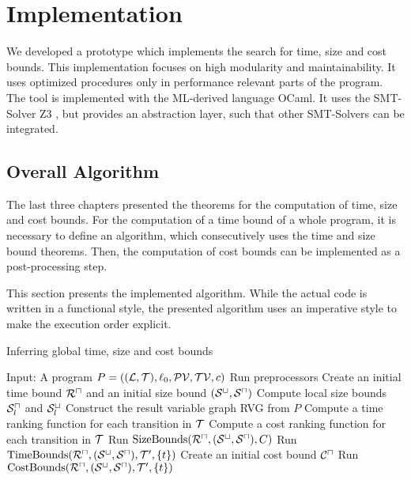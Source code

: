 \section{Implementation}

We developed a prototype which implements the search for time, size and cost bounds.
This implementation focuses on high modularity and maintainability.
It uses optimized procedures only in performance relevant parts of the program.
The tool is implemented with the ML-derived language OCaml.
It uses the SMT-Solver Z3 \cite{z3}, but provides an abstraction layer, such that other SMT-Solvers can be integrated.

\subsection{Overall Algorithm}

The last three chapters presented the theorems for the computation of time, size and cost bounds.
For the computation of a time bound of a whole program, it is necessary to define an algorithm, which consecutively uses the time and size bound theorems.
Then, the computation of cost bounds can be implemented as a post-processing step.

This section presents the implemented algorithm.
While the actual code is written in a functional style, the presented algorithm uses an imperative style to make the execution order explicit.

\begin{algorithm}
\caption{Inferring global time, size and cost bounds}\label{complete_algorithm}
\begin{algorithmic}[1]
  \State Input: A program $P = ((\mathcal{L}, \mathcal{T}),\ell_0,\mathcal{PV},\mathcal{TV},c)$
  \State Run preprocessors
  \State Create an initial time bound ${\mathcal{R}^\sqcap}$ and an initial size bound ${({\mathcal{S}^\sqcup}, {\mathcal{S}^\sqcap})}$
  \State Compute local size bounds ${\mathcal{S}^\sqcap_l}$ and ${\mathcal{S}^\sqcup_l}$
  \State Construct the result variable graph RVG from $P$
  \State Compute a time ranking function for each transition in $\mathcal{T}$
  \State Compute a cost ranking function for each transition in $\mathcal{T}$
  \Repeat
      \State Run $\text{SizeBounds}({\mathcal{R}^\sqcap}, {({\mathcal{S}^\sqcup}, {\mathcal{S}^\sqcap})}, C)$
    \EndFor
        \State Run $\text{TimeBounds}({\mathcal{R}^\sqcap}, {({\mathcal{S}^\sqcup}, {\mathcal{S}^\sqcap})}, \mathcal{T}', \lbrace t \rbrace)$
      \EndFor
    \EndFor
  \State Create an initial cost bound ${\mathcal{C}^\sqcap}$
    \State Run $\text{CostBounds}({\mathcal{R}^\sqcap}, {({\mathcal{S}^\sqcup}, {\mathcal{S}^\sqcap})}, \mathcal{T}', \lbrace t \rbrace)$
  \EndFor
\end{algorithmic}
\end{algorithm}


